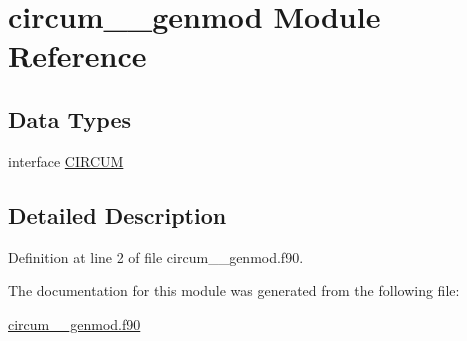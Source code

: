 \hypertarget{classcircum____genmod}{\section{circum\+\_\+\+\_\+genmod Module Reference}
\label{classcircum____genmod}
}
\subsection*{Data Types}
\begin{DoxyCompactItemize}
\item 
interface \hyperlink{interfacecircum____genmod_1_1CIRCUM}{C\+I\+R\+C\+U\+M}
\end{DoxyCompactItemize}


\subsection{Detailed Description}


Definition at line 2 of file circum\+\_\+\+\_\+genmod.\+f90.



The documentation for this module was generated from the following file\+:\begin{DoxyCompactItemize}
\item 
\hyperlink{circum____genmod_8f90}{circum\+\_\+\+\_\+genmod.\+f90}\end{DoxyCompactItemize}
